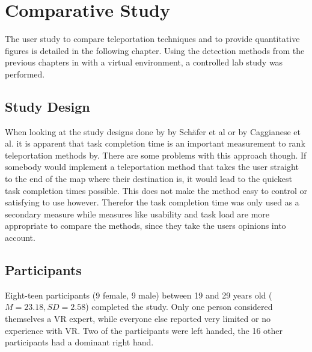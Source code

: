 \chapter{Comparative Study}
The user study to compare teleportation techniques and to provide quantitative figures is detailed in the following chapter. Using the detection methods from the previous chapters in with a virtual environment, a controlled lab study was performed. 


\section{Study Design}
When looking at the study designs done by by Schäfer et al \cite{Schafer2021} or by Caggianese et al. \cite{Caggianese} it is apparent that task completion time is an important measurement to rank teleportation methods by. There are some problems with this approach though. If somebody would implement a teleportation method that takes the user straight to the end of the map where their destination is, it would lead to the quickest task completion times possible. This does not make the method easy to control or satisfying to use however. Therefor the task completion time was only used as a secondary measure while measures like usability and task load are more appropriate to compare the methods, since they take the users opinions into account. 

\section{Participants}
Eight-teen participants (9 female, 9 male) between 19 and 29 years old ($M=23.18,SD=2.58$) completed the study. Only one person considered themselves a VR expert, while everyone else reported very limited or no experience with VR. Two of the participants were left handed, the 16 other participants had a dominant right hand. 




